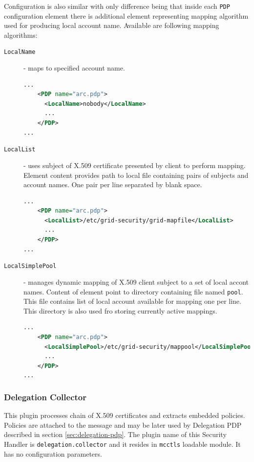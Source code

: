 \documentclass{article}
\begin{document}
Configuration is also similar with only difference being that inside 
each \texttt{PDP} configuration element there is additional element
representing mapping algorithm used for producing local account name.
Available are following mapping algorithms:
\begin{description}
\item[\texttt{LocalName}] - maps to specified account name.
\begin{lstlisting}[language=xml]
...
    <PDP name="arc.pdp">
      <LocalName>nobody</LocalName>
      ...
    </PDP>
...
\end{lstlisting}

\item[\texttt{LocalList}] - uses subject of X.509 certificate presented by client
to perform mapping. Element content provides path to local file containing pairs
of subjects and account names. One pair per line separated by blank space.
\begin{lstlisting}[language=xml]
...
    <PDP name="arc.pdp">
      <LocalList>/etc/grid-security/grid-mapfile</LocalList>
      ...
    </PDP>
...
\end{lstlisting}

\item[\texttt{LocalSimplePool}] - manages dynamic mapping of X.509 client subject
to a set of local accont names. Content of element point to directory containing
file named \texttt{pool}. This file contains list of local account available for
mapping one per line. This directory is also used fro storing currently active
mappings.
\begin{lstlisting}[language=xml]
...
    <PDP name="arc.pdp">
      <LocalSimplePool>/etc/grid-security/mappool</LocalSimplePool>
      ...
    </PDP>
...
\end{lstlisting}
\end{description}

\subsubsection{Delegation Collector}\label{sec:delegcollector-shc}
This plugin processes chain of X.509 certificates and extracts embedded
policies. Policies are attached to the message and may be later used by
Delegation PDP described in section \ref{sec:delegation-pdp}. The
plugin name of this Security Handler is \texttt{delegation.collector} 
and it resides in \texttt{mcctls} loadable module.
It has no configuration parameters.

\end{document}
